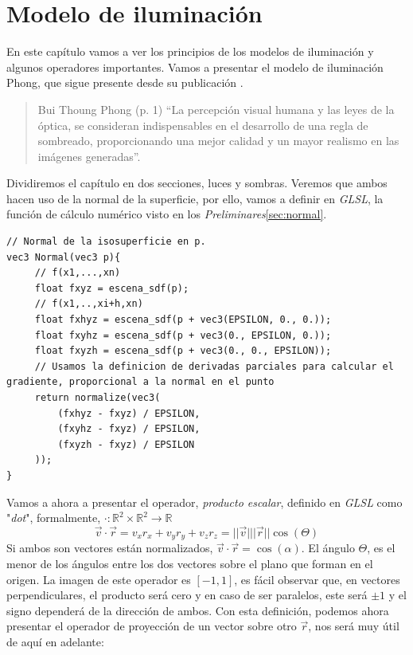 \chapter{Modelo de iluminación\label{ch:iluminacion}}
En este capítulo vamos a ver los principios de los modelos de iluminación y algunos operadores importantes. Vamos a presentar el modelo de iluminación Phong, que sigue presente desde su publicación \cite{phong1975illumination}.
\begin{quote}{Bui Thoung Phong \cite{cite} (p. 1)}
    \enquote{La percepción visual humana y las leyes de la óptica, se consideran indispensables en el desarrollo de una regla de sombreado, proporcionando una mejor calidad y un mayor realismo en las imágenes generadas}.
\end{quote}
Dividiremos el capítulo en dos secciones, luces y sombras. Veremos que ambos hacen uso de la normal de la superficie, por ello, vamos a definir en \textit{GLSL}, la función de cálculo numérico visto en los \textit{Preliminares}\ref{sec:normal}.
\begin{lstlisting}
// Normal de la isosuperficie en p.
vec3 Normal(vec3 p){
     // f(x1,...,xn)
     float fxyz = escena_sdf(p);
     // f(x1,..,xi+h,xn)
     float fxhyz = escena_sdf(p + vec3(EPSILON, 0., 0.));
     float fxyhz = escena_sdf(p + vec3(0., EPSILON, 0.));
     float fxyzh = escena_sdf(p + vec3(0., 0., EPSILON));
     // Usamos la definicion de derivadas parciales para calcular el gradiente, proporcional a la normal en el punto
     return normalize(vec3(
         (fxhyz - fxyz) / EPSILON,
         (fxyhz - fxyz) / EPSILON,
         (fxyzh - fxyz) / EPSILON
     ));
}
\end{lstlisting}
\newpage
Vamos a ahora a presentar el operador, \textit{producto escalar},
definido en \textit{GLSL} como "\textit{dot}", formalmente, \(\cdot :\mathbb{R}^2\times\mathbb{R}^2\longrightarrow \mathbb{R}\) 
\[\Vec{v} \cdot  \Vec{r} = v_xr_x + v_yr_y + v_zr_z = \vert \vert\Vec{v}\vert\vert\vert \Vec{r}\vert\vert\cos(\Theta)\]
Si ambos son vectores están normalizados, \(\Vec{v} \cdot \Vec{r} = \cos(\alpha)\). El ángulo \(\Theta\), es el menor de los ángulos entre los dos vectores sobre el plano que forman en el origen. La imagen de este operador es \([-1,1]\), es fácil observar que, en vectores perpendiculares, el producto será cero y en caso de ser paralelos, este será \(\pm 1\) y el signo dependerá de la dirección de ambos. Con esta definición, podemos ahora presentar el operador de proyección de un vector  sobre otro \(\Vec{r}\), nos será muy útil de aquí en adelante:


